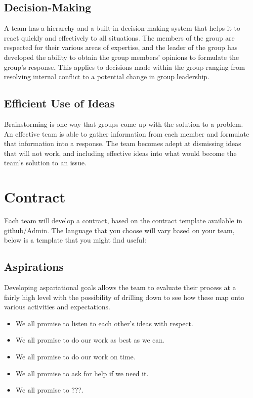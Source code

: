 \documentclass{article}\usepackage[]{graphicx}\usepackage[]{color}
\begin{document}
\subsection{Decision-Making}
A team has a hierarchy and a built-in decision-making system that helps it to react quickly and effectively to all situations. The members of the group are respected for their various areas of expertise, and the leader of the group has developed the ability to obtain the group members' opinions to formulate the group's response. This applies to decisions made within the group ranging from resolving internal conflict to a potential change in group leadership.

\subsection{Efficient Use of Ideas}

Brainstorming is one way that groups come up with the solution to a problem. An effective team is able to gather information from each member and formulate that information into a response. The team becomes adept at dismissing ideas that will not work, and including effective ideas into what would become the team's solution to an issue.

\section{Contract}

Each team will develop a contract, based on the contract template available in github/Admin. The language that you choose will vary based on your team, below is a template that you might find useful:

\subsection{Aspirations}

Developing aspariational goals allows the team to evaluate their process at a fairly high level with the possibility of drilling down to see how these map onto various activities and expectations. 

\begin{itemize}
  \item We all promise to listen to each other's ideas with respect.
  \item We all promise to do our work as best as we can.
  \item We all promise to do our work on time.
  \item We all promise to ask for help if we need it.
  \item We all promise to ???.
\end{itemize}
\end{document}
